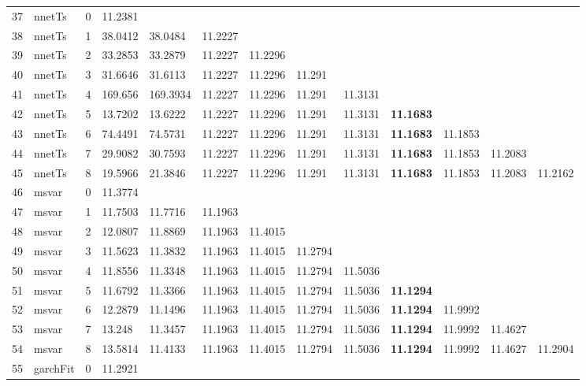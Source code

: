 \documentclass[10pt,a4paper]{article}
\begin{document}
\begin{table}[ht]
\begin{tabular}{rlrllllllllll}
   \hline
37 & nnetTs &     0 & 11.2381 &  &  &  &  &  &  &  &  &  \\ 
  38 & nnetTs &     1 & 38.0412 & 38.0484 & 11.2227 &  &  &  &  &  &  &  \\ 
  39 & nnetTs &     2 & 33.2853 & 33.2879 & 11.2227 & 11.2296 &  &  &  &  &  &  \\ 
  40 & nnetTs &     3 & 31.6646 & 31.6113 & 11.2227 & 11.2296 & 11.291 &  &  &  &  &  \\ 
  41 & nnetTs &     4 & 169.656 & 169.3934 & 11.2227 & 11.2296 & 11.291 & 11.3131 &  &  &  &  \\ 
  42 & nnetTs &     5 & 13.7202 & 13.6222 & 11.2227 & 11.2296 & 11.291 & 11.3131 & \textbf{11.1683} &  &  &  \\ 
  43 & nnetTs &     6 & 74.4491 & 74.5731 & 11.2227 & 11.2296 & 11.291 & 11.3131 & \textbf{11.1683} & 11.1853 &  &  \\ 
  44 & nnetTs &     7 & 29.9082 & 30.7593 & 11.2227 & 11.2296 & 11.291 & 11.3131 & \textbf{11.1683} & 11.1853 & 11.2083 &  \\ 
  45 & nnetTs &     8 & 19.5966 & 21.3846 & 11.2227 & 11.2296 & 11.291 & 11.3131 & \textbf{11.1683} & 11.1853 & 11.2083 & 11.2162 \\ 
   \hline
46 & msvar &     0 & 11.3774 &  &  &  &  &  &  &  &  &  \\ 
  47 & msvar &     1 & 11.7503 & 11.7716 & 11.1963 &  &  &  &  &  &  &  \\ 
  48 & msvar &     2 & 12.0807 & 11.8869 & 11.1963 & 11.4015 &  &  &  &  &  &  \\ 
  49 & msvar &     3 & 11.5623 & 11.3832 & 11.1963 & 11.4015 & 11.2794 &  &  &  &  &  \\ 
  50 & msvar &     4 & 11.8556 & 11.3348 & 11.1963 & 11.4015 & 11.2794 & 11.5036 &  &  &  &  \\ 
  51 & msvar &     5 & 11.6792 & 11.3366 & 11.1963 & 11.4015 & 11.2794 & 11.5036 & \textbf{11.1294} &  &  &  \\ 
  52 & msvar &     6 & 12.2879 & 11.1496 & 11.1963 & 11.4015 & 11.2794 & 11.5036 & \textbf{11.1294} & 11.9992 &  &  \\ 
  53 & msvar &     7 & 13.248 & 11.3457 & 11.1963 & 11.4015 & 11.2794 & 11.5036 & \textbf{11.1294} & 11.9992 & 11.4627 &  \\ 
  54 & msvar &     8 & 13.5814 & 11.4133 & 11.1963 & 11.4015 & 11.2794 & 11.5036 & \textbf{11.1294} & 11.9992 & 11.4627 & 11.2904 \\ 
   \hline
55 & garchFit &     0 & 11.2921 &  &  &  &  &  &  &  &  &  \\ 

\end{tabular}
\end{table}
\end{document}
